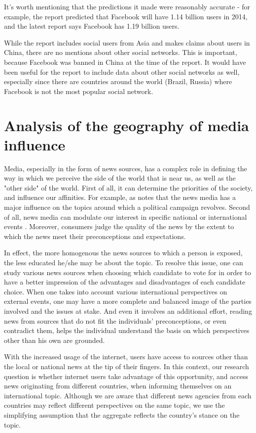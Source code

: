 \documentclass{acm_proc_10ptArticle-sp}
\begin{document}
It’s worth mentioning that the predictions it made were reasonably accurate - for example, the report predicted that Facebook will have 1.14 billion users in 2014, and the latest report says Facebook has 1.19 billion users.

While the report includes social users from Asia and makes claims about users in China, there are no mentions about other social networks. This is important, because Facebook was banned in China at the time of the report. It would have been useful for the report to include data about other social networks as well, especially since there are countries around the world (Brazil, Russia) where Facebook is not the most popular social network.


\section{Analysis of the geography of media influence}

Media, especially in the form of news sources, has a complex role in defining the way in which we perceive the side of the world that is near us, as well as the "other side" of the world. First of all, it can determine the priorities of the society, and influence our affinities. For example, as   notes that the news media has a major influence on the topics around which a political campaign revolves. Second of all, news media can modulate our interest in specific national or international events \cite{wanta2004agenda}. Moreover, consumers judge the quality of the news by the extent to which the news meet their preconceptions and expectations\cite{gentzkow2005media}. 

In effect, the more homogenous the news sources to which a person is exposed, the less educated he/she may be about the topic. To resolve this issue, one can study various news sources when choosing which candidate to vote for in order to have a better impression of the advantages and disadvantages of each candidate choice. When one takes into account various international perspectives on external events, one may have a more complete and balanced image of the parties involved and the issues at stake. And even it involves an additional effort, reading news from sources that do not fit the individuals' preconceptions, or even contradict them, helps the individual understand the basis on which perspectives other than his own are grounded.

With the increased usage of the internet, users have access to sources other than the local or national news at the tip of their fingers. In this context, our research question is whether internet users take advantage of this opportunity, and access news originating from different countries, when informing themselves on an international topic. Although we are aware that different news agencies from each countries may reflect different perspectives on the same topic, we use the simplifying assumption that the aggregate reflects the country's stance on the topic.
\end{document}
